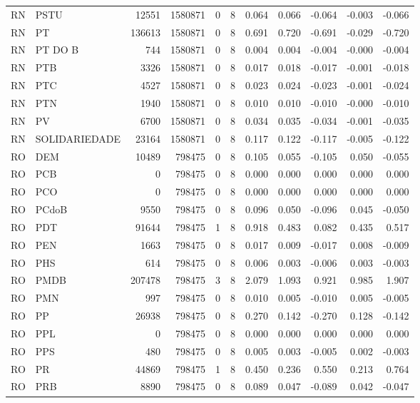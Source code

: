 \begin{landscape}
\begin{longtable}{llrrrrrrrrr}
RN & PSTU & 12551 & 1580871 & 0 & 8 & 0.064 & 0.066 & -0.064 & -0.003 & -0.066 \\
RN & PT & 136613 & 1580871 & 0 & 8 & 0.691 & 0.720 & -0.691 & -0.029 & -0.720 \\
RN & PT DO B & 744 & 1580871 & 0 & 8 & 0.004 & 0.004 & -0.004 & -0.000 & -0.004 \\
RN & PTB & 3326 & 1580871 & 0 & 8 & 0.017 & 0.018 & -0.017 & -0.001 & -0.018 \\
RN & PTC & 4527 & 1580871 & 0 & 8 & 0.023 & 0.024 & -0.023 & -0.001 & -0.024 \\
RN & PTN & 1940 & 1580871 & 0 & 8 & 0.010 & 0.010 & -0.010 & -0.000 & -0.010 \\
RN & PV & 6700 & 1580871 & 0 & 8 & 0.034 & 0.035 & -0.034 & -0.001 & -0.035 \\
RN & SOLIDARIEDADE & 23164 & 1580871 & 0 & 8 & 0.117 & 0.122 & -0.117 & -0.005 & -0.122 \\
RO & DEM & 10489 & 798475 & 0 & 8 & 0.105 & 0.055 & -0.105 & 0.050 & -0.055 \\
RO & PCB & 0 & 798475 & 0 & 8 & 0.000 & 0.000 & 0.000 & 0.000 & 0.000 \\
RO & PCO & 0 & 798475 & 0 & 8 & 0.000 & 0.000 & 0.000 & 0.000 & 0.000 \\
RO & PCdoB & 9550 & 798475 & 0 & 8 & 0.096 & 0.050 & -0.096 & 0.045 & -0.050 \\
RO & PDT & 91644 & 798475 & 1 & 8 & 0.918 & 0.483 & 0.082 & 0.435 & 0.517 \\
RO & PEN & 1663 & 798475 & 0 & 8 & 0.017 & 0.009 & -0.017 & 0.008 & -0.009 \\
RO & PHS & 614 & 798475 & 0 & 8 & 0.006 & 0.003 & -0.006 & 0.003 & -0.003 \\
RO & PMDB & 207478 & 798475 & 3 & 8 & 2.079 & 1.093 & 0.921 & 0.985 & 1.907 \\
RO & PMN & 997 & 798475 & 0 & 8 & 0.010 & 0.005 & -0.010 & 0.005 & -0.005 \\
RO & PP & 26938 & 798475 & 0 & 8 & 0.270 & 0.142 & -0.270 & 0.128 & -0.142 \\
RO & PPL & 0 & 798475 & 0 & 8 & 0.000 & 0.000 & 0.000 & 0.000 & 0.000 \\
RO & PPS & 480 & 798475 & 0 & 8 & 0.005 & 0.003 & -0.005 & 0.002 & -0.003 \\
RO & PR & 44869 & 798475 & 1 & 8 & 0.450 & 0.236 & 0.550 & 0.213 & 0.764 \\
RO & PRB & 8890 & 798475 & 0 & 8 & 0.089 & 0.047 & -0.089 & 0.042 & -0.047 \\

\end{longtable}
\end{landscape}
